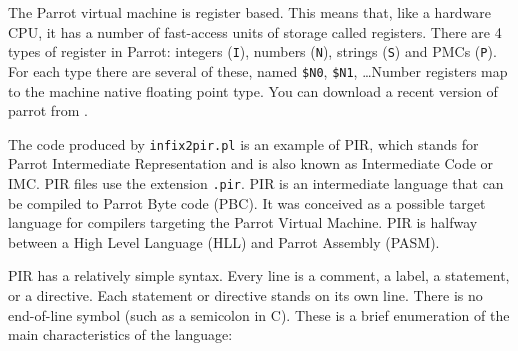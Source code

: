 The Parrot virtual machine \cite{parrot} is register based. This means that, like a hardware
CPU, it has a number of fast-access units of storage called registers.
There are 4 types of register in Parrot: integers (\verb|I|), numbers (\verb|N|),
strings (\verb|S|) and PMCs (\verb|P|). For each type there are several of these, named
\verb|$N0|, \verb|$N1|, \ldots  Number registers map
to the machine native floating point type. 
You can download a recent version of parrot from
.

The code produced by \verb|infix2pir.pl| is an example of PIR, which stands for 
Parrot Intermediate Representation and is also known as
Intermediate Code or IMC. PIR files use the extension \verb|.pir|.
PIR is an intermediate language that can be compiled to
Parrot Byte code (PBC). It was conceived as a possible target language for compilers
targeting the Parrot Virtual Machine. PIR is halfway between a High
Level Language (HLL) and Parrot Assembly (PASM).

PIR has a relatively simple syntax. Every line is a comment, a
label, a statement, or a directive. Each statement or directive
stands on its own line. There is no end-of-line symbol (such as a
semicolon in C). These is a brief enumeration of the main characteristics of the language:

